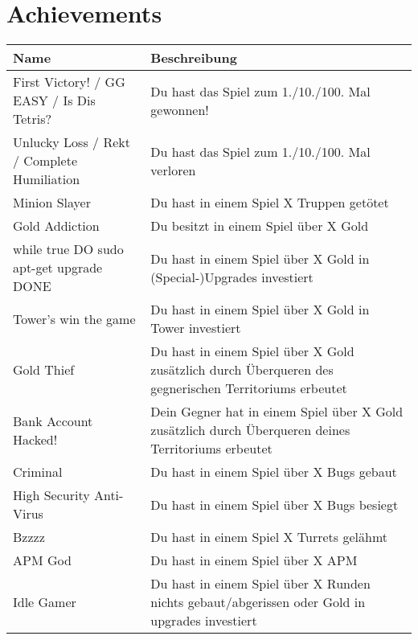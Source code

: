 \section{Achievements}

%


\begin{table}[ht]
  \caption{Achievements}
  \small
  \begin{longtabu}{X[-1]X}
    \toprule\rowfont{\itshape}
    Name & Beschreibung \\
    \midrule\endhead

    First Victory! / GG EASY / Is Dis Tetris?
      & Du hast das Spiel zum 1./10./100. Mal gewonnen!
      	\\
    Unlucky Loss / Rekt / Complete Humiliation
    	& Du hast das Spiel zum 1./10./100. Mal verloren
    	\\
	Minion Slayer
		& Du hast in einem Spiel X Truppen getötet
		\\
	Gold Addiction
		& Du besitzt in einem Spiel über X Gold
		\\
	while true DO sudo apt-get upgrade DONE
		& Du hast in einem Spiel über X Gold in (Special-)Upgrades investiert
		\\
	Tower's win the game
		& Du hast in einem Spiel über X Gold in Tower investiert
		\\
	Gold Thief
		& Du hast in einem Spiel über X Gold zusätzlich durch Überqueren des gegnerischen
		Territoriums erbeutet
		\\
	Bank Account Hacked!
		& Dein Gegner hat in einem Spiel über X Gold zusätzlich durch Überqueren deines
		Territoriums erbeutet
		\\
	Criminal
		& Du hast in einem Spiel über X Bugs gebaut
		\\
	High Security Anti-Virus
		& Du hast in einem Spiel über X Bugs besiegt
		\\
	Bzzzz
		& Du hast in einem Spiel X Turrets gelähmt
		\\
	APM God
		& Du hast in einem Spiel über X APM
		\\
	Idle Gamer
		& Du hast in einem Spiel über X Runden nichts gebaut/abgerissen oder Gold in upgrades investiert
		\\
    \bottomrule
  \end{longtabu}
\end{table}
